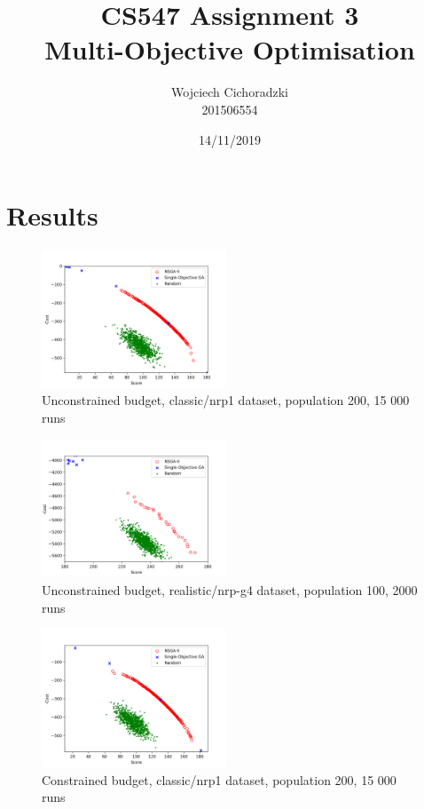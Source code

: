 \documentclass[12pt]{article}
\title{CS547 Assignment 3\\Multi-Objective Optimisation}
\author{Wojciech Cichoradzki\\201506554}
\date{14/11/2019}
\begin{document}
\maketitle

\section{Results}

\begin{figure}[H]
  \centering
  \includegraphics[width=0.49\textwidth]{classic_no_constraint}
  \caption{Unconstrained budget, classic/nrp1 dataset, population 200, 15 000 runs}
  \label{fig:1}
\end{figure}

\begin{figure}[H]
  \centering
  \includegraphics[width=0.49\textwidth]{realistic_no_constraint}
  \caption{Unconstrained budget, realistic/nrp-g4 dataset, population 100, 2000 runs}
  \label{fig:2}
\end{figure}

\begin{figure}[H]
  \centering
  \includegraphics[width=0.49\textwidth]{classic_constraint}
  \caption{Constrained budget, classic/nrp1 dataset, population 200, 15 000 runs}
  \label{fig:3}
\end{figure}
\end{document}
